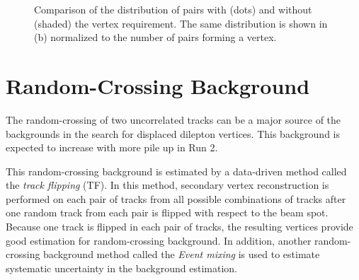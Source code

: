 \begin{figure}[!htb]
    \centering
    \label{fig:cosmicCR} 
	\caption{Comparison of the \Rcr distribution of \mumu pairs with (dots) and without (shaded) the vertex requirement. The same distribution is shown in (b) normalized to the number of \mumu pairs forming a vertex.}
\end{figure}



\section{Random-Crossing Background}
\label{sec:bkg:random}

The random-crossing of two uncorrelated tracks can be a major source of the backgrounds in the search for displaced dilepton vertices. This background is expected to increase with more pile up in Run 2.
 
This random-crossing background is estimated by a data-driven method called the \textit{track flipping} (TF). In this method, secondary vertex reconstruction is performed on each pair of tracks from all possible combinations of tracks after one random track from each pair is flipped with respect to the beam spot. Because one track is flipped in each pair of tracks, the resulting vertices provide good estimation for random-crossing background. In addition, another random-crossing background method called the \textit{Event mixing} is used to estimate systematic uncertainty in the background estimation.

